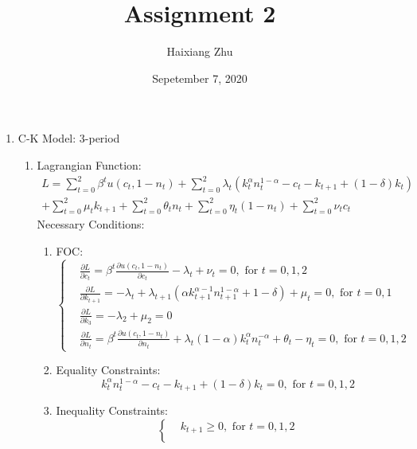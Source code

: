 \documentclass{article}
\title{Assignment 2}
\date{Sepetember 7, 2020}
\author{Haixiang Zhu}
\begin{document}
\maketitle
\begin{enumerate}
    \item C-K Model: 3-period
    \begin{enumerate}
        \item Lagrangian Function:
        \begin{multline*}
            L=\sum_{t=0}^2\beta^tu(c_t,1-n_t)+\sum_{t=0}^2\lambda_t(k_t^\alpha n_t^{1-\alpha}-c_t-k_{t+1}+(1-\delta)k_t)\\
            +\sum_{t=0}^2\mu_tk_{t+1}+\sum_{t=0}^2\theta_t n_t+\sum_{t=0}^2\eta_t(1-n_t)+\sum_{t=0}^2\nu_tc_t
        \end{multline*}
        Necessary Conditions:
        \begin{enumerate}
            \item FOC:
            \begin{equation*}
                \left\{\begin{aligned}
                    &\frac{\partial L}{\partial c_t}=\beta^t\frac{\partial u(c_t,1-n_t)}{\partial c_t}-\lambda_t+\nu_t=0,\text{ for }t=0,1,2\\
                    &\frac{\partial L}{\partial k_{t+1}}=-\lambda_t+\lambda_{t+1}(\alpha k_{t+1}^{\alpha-1}n_{t+1}^{1-\alpha}+1-\delta)+\mu_t=0,\text{ for }t=0,1\\
                    &\frac{\partial L}{\partial k_3}=-\lambda_2+\mu_2=0\\
                    &\frac{\partial L}{\partial n_t}=\beta^t\frac{\partial u(c_t,1-n_t)}{\partial n_t}+\lambda_t(1-\alpha)k_t^\alpha n_t^{-\alpha}+\theta_t-\eta_t=0,\text{ for }t=0,1,2
                \end{aligned}\right.
            \end{equation*}
            \item Equality Constraints:
            \begin{equation*}
                k_t^\alpha n_t^{1-\alpha}-c_t-k_{t+1}+(1-\delta)k_t=0,\text{ for }t=0,1,2
            \end{equation*}
            \item Inequality Constraints:
            \begin{equation*}
                \left\{\begin{aligned}
                    &k_{t+1}\ge0,\text{ for }t=0,1,2\\

\end{aligned}
\end{equation*}
\end{enumerate}
\end{enumerate}
\end{enumerate}
\end{document}
